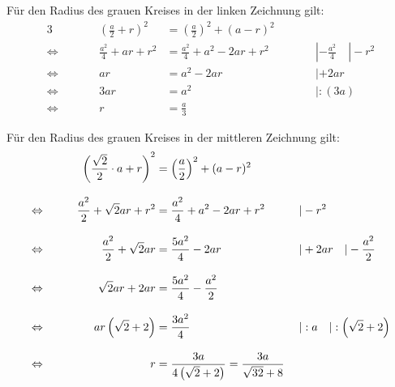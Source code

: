 \begin{exercise}
\begin{center}
    \end{center}
  \fi
  \ifoutcome\outcome
    \newcommand{\fakewidth}[1]
    {%
      \makebox[0pt][l]
      {%
        \ensuremath
        {%
          \displaystyle#1%
        }%
      }%
    }%

    Für den Radius des grauen Kreises in der linken Zeichnung gilt:
    \begin{alignat*}{3}
                     &\qquad & \left(\frac{a}{2}+r\right)^2&=\left(\frac{a}{2}\right)^2+(a-r)^2 & \qquad&                          \\[2ex]
      \Leftrightarrow&\qquad &         \frac{a^2}{4}+ar+r^2&=\frac{a^2}{4}+a^2-2ar+r^2          & \qquad&|-\frac{a^2}{4}\quad|-r^2 \\[2ex]
      \Leftrightarrow&\qquad &                       ar    &=              a^2-2ar              & \qquad&|+2ar                     \\[2ex]
      \Leftrightarrow&\qquad &                      3ar    &=              a^2                  & \qquad&|:(3a)                    \\[2ex]
      \Leftrightarrow&\qquad &                        r    &=        \frac{a}{3}                & \qquad&
    \end{alignat*}

    Für den Radius des grauen Kreises in der mittleren Zeichnung gilt:
    \begin{alignat*}{3}
                     &\qquad & \left(\frac{\sqrt{2}}{2}\cdot a+r\right)^2   &=\left(\frac{a}{2}\right)^2+(a-r)^2  & \qquad&                                  \\[2ex]
      \Leftrightarrow&\qquad &               \frac{a^2}{2}+\sqrt{2}ar+r^2   &=\frac{ a^2}{4}+a^2-2ar+r^2          & \qquad&|-r^2                             \\[2ex]
      \Leftrightarrow&\qquad &               \frac{a^2}{2}+\sqrt{2}ar       &=\frac{5a^2}{4}    -2ar              & \qquad&|+2ar\quad|-\frac{a^2}{2}         \\[2ex]
      \Leftrightarrow&\qquad &                             \sqrt{2}ar+2ar   &=\frac{5a^2}{4}-\frac{a^2}{2}        & \qquad&                                  \\[2ex]
      \Leftrightarrow&\qquad &                     ar\left(\sqrt{2}+2\right)&=\frac{3a^2}{4}                      & \qquad&|:a\quad|:\left(\sqrt{2}+2\right) \\[2ex]
      \Leftrightarrow&\qquad &                      r                       &=\frac{3a}{4\left(\sqrt{2}+2\right)}
                                                                             =\fakewidth{\frac{3a}{\sqrt{32}+8}}  & \qquad&
    \end{alignat*}


\end{exercise}
